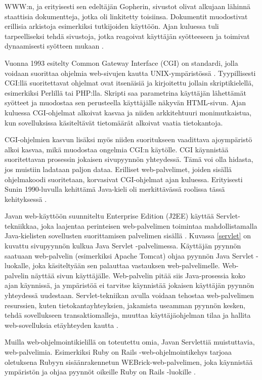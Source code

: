 WWW:n, ja erityisesti sen edeltäjän Gopherin, sivustot olivat alkujaan lähinnä staattisia dokumentteja, jotka oli linkitetty toisiinsa. Dokumentit muodostivat erillisia arkistoja esimerkiksi tutkijoiden käyttöön. Ajan kuluessa tuli tarpeelliseksi tehdä sivustoja, jotka reagoivat käyttäjän syötteeseen ja toimivat dynaamisesti syötteen mukaan \cite{dynamic}.

Vuonna 1993 esitelty Common Gateway Interface (CGI) on standardi, jolla voidaan suorittaa ohjelmia web-sivujen kautta UNIX-ympäristössä \cite{rfc3875}. Tyypillisesti CGI:llä suoritettavat ohjelmat ovat itsenäisiä ja kirjoitettu jollain skriptikielellä, esimerkiksi Perlillä tai PHP:lla. Skripti saa parametrina käyttäjän lähettämät syötteet ja muodostaa sen perusteella käyttäjälle näkyvän HTML-sivun. Ajan kuluessa CGI-ohjelmat alkoivat kasvaa ja niiden arkkitehtuuri monimutkaistua, kun sovelluksissa käsiteltävät tietomäärät alkoivat vaatia tietokantoja.

CGI-ohjelmien kasvun lisäksi myös niiden suoritukseen vaadittava ajoympäristö alkoi kasvaa, mikä muodostaa ongelmia CGI:n käytölle. CGI käynnistää suoritettavan prosessin jokaisen sivupyynnön yhteydessä. Tämä voi olla hidasta, jos muistiin ladataan paljon dataa. Erilliset web-palvelimet, joiden sisällä ohjelmakoodi suoritetaan, korvasivat CGI-ohjelmat ajan kuluessa. Erityisesti Sunin 1990-luvulla kehittämä Java-kieli oli merkittävässä roolissa tässä kehityksessä \cite{uml}.

Javan web-käyttöön suunniteltu Enterprise Edition (J2EE) käyttää Serv\-let-tek\-niik\-kaa, joka laajentaa perinteisen web-palvelimen toimintaa mahdollistamalla Java-kielisten sovellusten suorittamisen palvelimen sisällä \cite{j2ee} . Kuvassa \ref{servlet} on kuvattu sivupyynnön kulkua Java Servlet -palvelimessa. Käyttäjän pyynnön saatuaan web-palvelin (esimerkiksi Apache Tomcat) ohjaa pyynnön Java Servlet -luokalle, joka käsiteltyään sen palauttaa vastauksen web-palvelimelle. Web-palvelin näyttää sivun käyttäjälle. Web-palvelin pitää siis Java-prosessia koko ajan käynnissä, ja ympäristöä ei tarvitse käynnistää jokaisen käyttäjän pyynnön yhteydessä uudestaan. Servlet-tekniikan avulla voidaan tehostaa web-palvelimen resurssien, kuten tietokantayhteyksien, jakamista useamman pyynnön kesken, tehdä sovellukseen transaktiomalleja, muuttaa käyttäjäohjelman tilaa ja hallita web-sovelluksia etäyhteyden kautta \cite{uml}.

Muilla web-ohjelmointikielillä on toteutettu omia, Javan Servlettiä muistuttavia, web-palvelimia. Esimerkiksi Ruby on Rails -web-ohjelmointikehys tarjoaa oletuksena Rubyyn sisäänrakennetun WEBrick-web-palvelimen, joka käynnistää ympäristön ja ohjaa pyynnöt oikeille Ruby on Rails -luokille \cite{ruby2011agile}.


